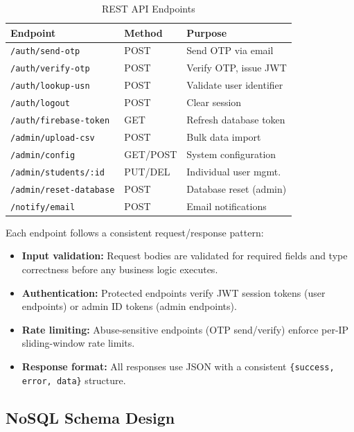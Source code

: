 \documentclass[11pt,a4paper]{article}
\theoremstyle{plain}
\theoremstyle{definition}
\begin{document}
\begin{table}[htbp]
\centering
\caption{REST API Endpoints}
\label{tab:endpoints}
\small
\renewcommand{\arraystretch}{1.15}
\begin{tabular}{@{}lll@{}}
\toprule
\textbf{Endpoint} & \textbf{Method} & \textbf{Purpose} \\
\midrule
\texttt{/auth/send-otp} & POST & Send OTP via email \\
\texttt{/auth/verify-otp} & POST & Verify OTP, issue JWT \\
\texttt{/auth/lookup-usn} & POST & Validate user identifier \\
\texttt{/auth/logout} & POST & Clear session \\
\texttt{/auth/firebase-token} & GET & Refresh database token \\
\texttt{/admin/upload-csv} & POST & Bulk data import \\
\texttt{/admin/config} & GET/POST & System configuration \\
\texttt{/admin/students/:id} & PUT/DEL & Individual user mgmt. \\
\texttt{/admin/reset-database} & POST & Database reset (admin) \\
\texttt{/notify/email} & POST & Email notifications \\
\bottomrule
\end{tabular}
\end{table}

Each endpoint follows a consistent request/response pattern:
\begin{itemize}[noitemsep,topsep=3pt]
    \item \textbf{Input validation:} Request bodies are validated for required fields and type correctness before any business logic executes.
    \item \textbf{Authentication:} Protected endpoints verify JWT session tokens (user endpoints) or admin ID tokens (admin endpoints).
    \item \textbf{Rate limiting:} Abuse-sensitive endpoints (OTP send/verify) enforce per-IP sliding-window rate limits.
    \item \textbf{Response format:} All responses use JSON with a consistent \texttt{\{success, error, data\}} structure.
\end{itemize}

\subsection{NoSQL Schema Design}
\end{document}
